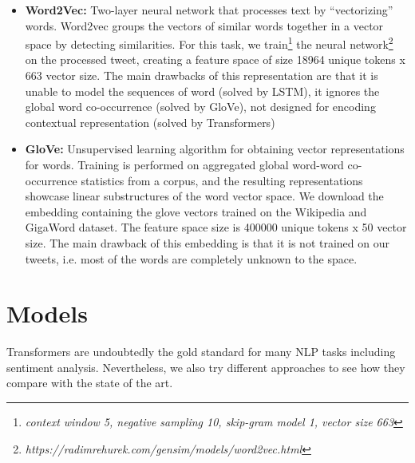 \documentclass{article}
\begin{document}
    \begin{itemize}
        \item \textbf{Word2Vec:} Two-layer neural network that processes text by “vectorizing” words.  Word2vec groups the vectors of similar words together in a vector space by detecting similarities. For this task, we train\footnote{\textit{context window 5, negative sampling 10, skip-gram model 1, vector size 663}} the neural network\footnote{\textit{https://radimrehurek.com/gensim/models/word2vec.html}} on the processed tweet, creating a feature space of size 18964 unique tokens x 663 vector size. The main drawbacks of this representation are that it is unable to model the sequences of word (solved by LSTM), it ignores the global word co-occurrence (solved by GloVe), not designed for encoding contextual representation (solved by Transformers)
        \item \textbf{GloVe\cite{glove}:} Unsupervised learning algorithm for obtaining vector representations for words. Training is performed on aggregated global word-word co-occurrence statistics from a corpus, and the resulting representations showcase linear substructures of the word vector space. We download the embedding containing the glove vectors trained on the Wikipedia and GigaWord dataset. The feature space size is 400000 unique tokens x 50 vector size. The main drawback of this embedding is that it is not trained on our tweets, i.e. most of the words are completely unknown to the space.
    \end{itemize}

\section{Models}
    Transformers are undoubtedly the gold standard for many NLP tasks including sentiment analysis. Nevertheless, we also try different approaches to see how they compare  with the state of the art.
    
\end{document}
